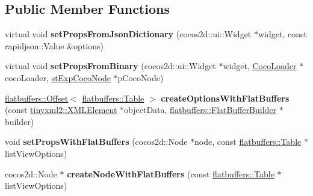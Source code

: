 \subsection*{Public Member Functions}
\begin{DoxyCompactItemize}
\item 
\mbox{\label{classcocostudio_1_1ListViewReader_a4902451a83baceda9367923ac0fe42e3}} 
virtual void {\bfseries set\+Props\+From\+Json\+Dictionary} (cocos2d\+::ui\+::\+Widget $\ast$widget, const rapidjson\+::\+Value \&options)
\item 
\mbox{\label{classcocostudio_1_1ListViewReader_a39908d377dbd6f302c5cd5a985b801c1}} 
virtual void {\bfseries set\+Props\+From\+Binary} (cocos2d\+::ui\+::\+Widget $\ast$widget, \hyperlink{classcocostudio_1_1CocoLoader}{Coco\+Loader} $\ast$coco\+Loader, \hyperlink{structcocostudio_1_1stExpCocoNode}{st\+Exp\+Coco\+Node} $\ast$p\+Coco\+Node)
\item 
\mbox{\label{classcocostudio_1_1ListViewReader_adea220a9837531930fa4e2e9aaa6ef35}} 
\hyperlink{structflatbuffers_1_1Offset}{flatbuffers\+::\+Offset}$<$ \hyperlink{classflatbuffers_1_1Table}{flatbuffers\+::\+Table} $>$ {\bfseries create\+Options\+With\+Flat\+Buffers} (const \hyperlink{classtinyxml2_1_1XMLElement}{tinyxml2\+::\+X\+M\+L\+Element} $\ast$object\+Data, \hyperlink{classflatbuffers_1_1FlatBufferBuilder}{flatbuffers\+::\+Flat\+Buffer\+Builder} $\ast$builder)
\item 
\mbox{\label{classcocostudio_1_1ListViewReader_a7f52e57aa65b1d8501e73a51437a4cb5}} 
void {\bfseries set\+Props\+With\+Flat\+Buffers} (cocos2d\+::\+Node $\ast$node, const \hyperlink{classflatbuffers_1_1Table}{flatbuffers\+::\+Table} $\ast$list\+View\+Options)
\item 
\mbox{\label{classcocostudio_1_1ListViewReader_ac6b2f8df639e7afef919fbadf9593067}} 
cocos2d\+::\+Node $\ast$ {\bfseries create\+Node\+With\+Flat\+Buffers} (const \hyperlink{classflatbuffers_1_1Table}{flatbuffers\+::\+Table} $\ast$list\+View\+Options)
\item 
\mbox{\label{classcocostudio_1_1ListViewReader_af440c56ebeaf19bdaed886356d673a96}} 

\end{DoxyCompactItemize}
